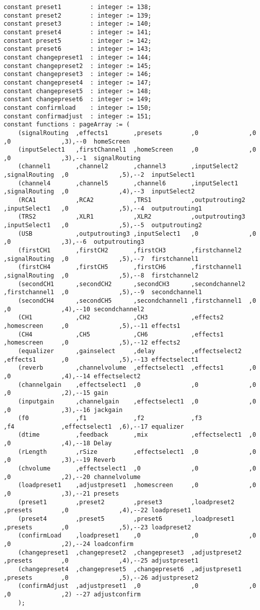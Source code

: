 \begin{lstlisting}
constant preset1		: integer := 138;
constant preset2		: integer := 139;
constant preset3		: integer := 140;
constant preset4		: integer := 141;
constant preset5		: integer := 142;
constant preset6		: integer := 143;
constant changepreset1	: integer := 144;
constant changepreset2	: integer := 145;
constant changepreset3	: integer := 146;
constant changepreset4	: integer := 147;
constant changepreset5	: integer := 148;
constant changepreset6	: integer := 149;
constant confirmload	: integer := 150;
constant confirmadjust	: integer := 151;
constant functions : pageArray := (
	(signalRouting	,effects1		,presets		,0				,0				,0				,3),--0  homeScreen
	(inputSelect1	,firstChannel1	,homeScreen		,0				,0				,0				,3),--1  signalRouting
	(channel1		,channel2		,channel3		,inputSelect2	,signalRouting	,0				,5),--2  inputSelect1
	(channel4		,channel5		,channel6		,inputSelect1	,signalRouting	,0				,4),--3  inputSelect2
	(RCA1			,RCA2			,TRS1			,outputrouting2	,inputSelect1	,0				,5),--4  outputrouting1
	(TRS2			,XLR1			,XLR2			,outputrouting3	,inputSelect1	,0				,5),--5  outputrouting2
	(USB			,outputrouting3	,inputSelect1	,0				,0				,0				,3),--6  outputrouting3
	(firstCH1		,firstCH2		,firstCH3		,firstchannel2	,signalRouting	,0				,5),--7  firstchannel1
	(firstCH4		,firstCH5		,firstCH6		,firstchannel1	,signalRouting	,0				,5),--8  firstchannel2
	(secondCH1		,secondCH2		,secondCH3		,secondchannel2	,firstchannel1	,0				,5),--9  secondchannel1
	(secondCH4		,secondCH5		,secondchannel1	,firstchannel1	,0				,0				,4),--10 secondchannel2
	(CH1			,CH2			,CH3			,effects2		,homescreen		,0				,5),--11 effects1
	(CH4			,CH5			,CH6			,effects1		,homescreen		,0				,5),--12 effects2
	(equalizer		,gainselect		,delay			,effectselect2	,effects1		,0				,5),--13 effectselect1
	(reverb			,channelvolume	,effectselect1	,effects1		,0				,0				,4),--14 effectselect2
	(channelgain	,effectselect1	,0				,0				,0				,0				,2),--15 gain
	(inputgain		,channelgain	,effectselect1	,0				,0				,0				,3),--16 jackgain
	(f0				,f1				,f2				,f3				,f4				,effectselect1	,6),--17 equalizer
	(dtime			,feedback		,mix			,effectselect1	,0				,0				,4),--18 Delay
	(rLength		,rSize			,effectselect1	,0				,0				,0				,3),--19 Reverb
	(chvolume		,effectselect1	,0				,0				,0				,0				,2),--20 channelvolume
	(loadpreset1	,adjustpreset1	,homescreen		,0				,0				,0				,3),--21 presets
	(preset1		,preset2		,preset3		,loadpreset2	,presets		,0				,4),--22 loadpreset1
	(preset4		,preset5		,preset6		,loadpreset1	,presets		,0				,5),--23 loadpreset2
	(confirmLoad	,loadpreset1	,0				,0				,0				,0				,2),--24 loadconfirm
	(changepreset1	,changepreset2	,changepreset3	,adjustpreset2	,presets		,0				,4),--25 adjustpreset1
	(changepreset4	,changepreset5	,changepreset6	,adjustpreset1	,presets		,0				,5),--26 adjustpreset2
	(confirmAdjust	,adjustpreset1	,0				,0				,0				,0				,2) --27 adjustconfirm
	);


\end{lstlisting}
